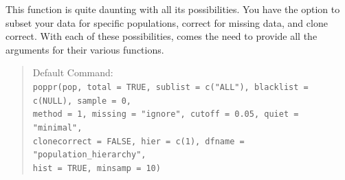 \documentclass[letterpaper]{article}
\newcommand{\tab}{\hspace*{1em}}
\begin{document}
\tab\tab This function is quite daunting with all its possibilities. You have the option to subset your data for specific populations, correct for missing data, and clone correct. With each of these possibilities, comes the need to provide all the arguments for their various functions.
\begin{quote}
Default Command:\\
\texttt{poppr(pop, total = TRUE, sublist = c("ALL"), blacklist = c(NULL), sample = 0,\\ 
        \tab method = 1, missing = "ignore", cutoff = 0.05, quiet = "minimal", \\
        \tab clonecorrect = FALSE, hier = c(1), dfname = "population\_hierarchy", \\
        \tab hist = TRUE, minsamp = 10)}
\end{quote}
\end{document}
